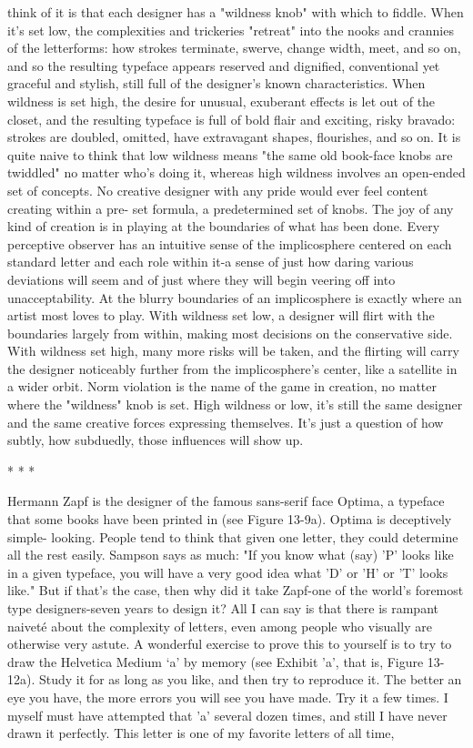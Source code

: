 think of it is that each designer has a "wildness knob" with which to fiddle. When it's set
low, the complexities and trickeries "retreat" into the nooks and crannies of the
letterforms: how strokes terminate, swerve, change width, meet, and so on, and so the
resulting typeface appears reserved and dignified, conventional yet graceful and stylish,
still full of the designer's known characteristics. When wildness is set high, the desire for
unusual, exuberant effects is let out of the closet, and the resulting typeface is full of bold
flair and exciting, risky bravado: strokes are doubled, omitted, have extravagant shapes,
flourishes, and so on. It is quite naive to think that low wildness means "the same old
book-face knobs are twiddled" no matter who's doing it, whereas high wildness involves
an open-ended set of concepts.
         No creative designer with any pride would ever feel content creating within a pre-
set formula, a predetermined set of knobs. The joy of any kind of creation is in playing at
the boundaries of what has been done. Every perceptive observer has an intuitive sense of
the implicosphere centered on each standard letter and each role within it-a sense of just
how daring various deviations will seem and of just where they will begin veering off
into unacceptability. At the blurry boundaries of an implicosphere is exactly where an
artist most loves to play. With wildness set low, a designer will flirt with the boundaries
largely from within, making most decisions on the conservative side. With wildness set
high, many more risks will be taken, and the flirting will carry the designer noticeably
further from the implicosphere's center, like a satellite in a wider orbit. Norm violation is
the name of the game in creation, no matter where the "wildness" knob is set. High
wildness or low, it's still the same designer and the same creative forces expressing
themselves. It's just a question of how subtly, how subduedly, those influences will show
up.

                                          *   *   *

        Hermann Zapf is the designer of the famous sans-serif face Optima, a typeface
that some books have been printed in (see Figure 13-9a). Optima is deceptively simple-
looking. People tend to think that given one letter, they could determine all the rest easily.
Sampson says as much: "If you know what (say) 'P' looks like in a given typeface, you
will have a very good idea what 'D' or 'H' or 'T' looks like." But if that's the case, then
why did it take Zapf-one of the world's foremost type designers-seven years to design it?
All I can say is that there is rampant naiveté about the complexity of letters, even among
people who visually are otherwise very astute.
A wonderful exercise to prove this to yourself is to try to draw the Helvetica Medium `a'
by memory (see Exhibit 'a', that is, Figure 13-12a). Study it for as long as you like, and
then try to reproduce it. The better an eye you have, the more errors you will see you
have made. Try it a few times. I myself must have attempted that 'a' several dozen times,
and still I have never drawn it perfectly. This letter is one of my favorite letters of all
time,




